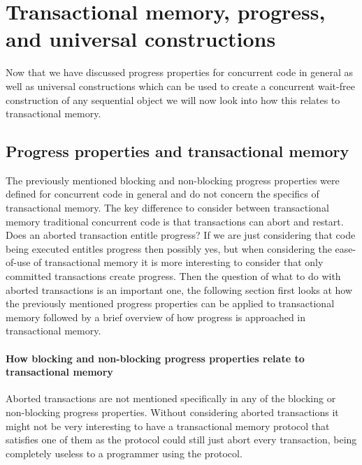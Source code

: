 








\section{Transactional memory, progress, and universal constructions}
Now that we have discussed progress properties for
concurrent code in general as well as
universal constructions which can be used to create
a concurrent wait-free construction of any sequential object
we will now look into how this relates to transactional memory.

\subsection{Progress properties and transactional memory}

The previously mentioned blocking and non-blocking progress
properties were defined for concurrent code in general
and do not concern the specifics of transactional memory.
The key difference to consider between transactional memory traditional concurrent
code is that transactions can abort and restart.
Does an aborted transaction entitle progress?
If we are just considering that code being executed entitles
progress then possibly yes, but when considering the ease-of-use of transactional
memory it is more interesting to consider that only committed transactions
create progress.
Then the question of what to do with aborted transactions is an important one,
the following section first looks at how the previously mentioned progress
properties can be applied to transactional memory
followed by a brief overview of how progress is approached in transactional
memory.

\paragraph{How blocking and non-blocking progress properties relate to transactional memory}
Aborted transactions are not mentioned specifically in any of the blocking
or non-blocking progress properties.
Without considering aborted transactions it might not be very interesting
to have a transactional memory protocol that satisfies one of them
as the protocol could still just abort every transaction, being completely
useless to a programmer using the protocol.

